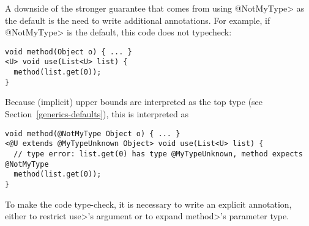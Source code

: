 A downside of the stronger guarantee that comes from using \<@NotMyType> as
the default is the need to write additional annotations.
For example, if \<@NotMyType> is the default, this code does not typecheck:

\begin{Verbatim}
void method(Object o) { ... }
<U> void use(List<U> list) {
  method(list.get(0));
}
\end{Verbatim}

Because (implicit) upper bounds are interpreted as the top type (see
Section~\ref{generics-defaults}), this is interpreted as

\begin{Verbatim}
void method(@NotMyType Object o) { ... }
<@U extends @MyTypeUnknown Object> void use(List<U> list) {
  // type error: list.get(0) has type @MyTypeUnknown, method expects @NotMyType
  method(list.get(0));
}
\end{Verbatim}

To make the code type-check, it is necessary to write an explicit
annotation, either to restrict \<use>'s argument or to expand \<method>'s
parameter type.




